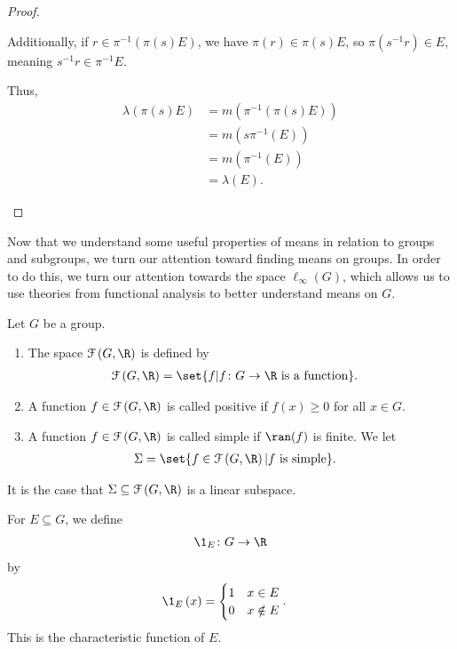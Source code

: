 \begin{proof}
\begin{enumerate}[(1)]
      Additionally, if $r\in \pi^{-1}\left(\pi(s)E\right)$, we have $\pi(r)\in \pi(s)E$, so $\pi\left(s^{-1}r\right)\in E$, meaning $s^{-1}r\in \pi^{-1}E$.\newline

      Thus,
      \begin{align*}
        \lambda\left(\pi\left(s\right)E\right) &= m\left(\pi^{-1}\left(\pi\left(s\right)E\right)\right)\\
                                               &= m\left(s\pi^{-1}\left(E\right)\right)\\
                                               &= m\left(\pi^{-1}\left(E\right)\right)\\
                                               &= \lambda\left(E\right).
      \end{align*}
  \end{enumerate}
\end{proof}
Now that we understand some useful properties of means in relation to groups and subgroups, we turn our attention toward finding means on groups. In order to do this, we turn our attention towards the space $\ell_{\infty}\left(G\right)$, which allows us to use theories from functional analysis to better understand means on $G$.
\begin{definition}
  Let $G$ be a group.
  \begin{enumerate}[(1)]
    \item The space $\mathcal{F}\left(G,\R\right)$ is defined by
      \begin{align*}
        \mathcal{F}\left(G,\R\right) &= \set{f | f\colon G\rightarrow \R\text{ is a function}}.
      \end{align*}
    \item A function $f\in \mathcal{F}\left(G,\R\right)$ is called positive if $f(x) \geq 0$ for all $x\in G$.
    \item A function $f\in \mathcal{F}\left(G,\R\right)$ is called simple if $\ran(f)$ is finite. We let
      \begin{align*}
        \Sigma &= \set{f\in \mathcal{F}\left(G,\R\right) | f\text{ is simple}}.
      \end{align*}
  \end{enumerate}
\end{definition}
\begin{fact}
  It is the case that $\Sigma \subseteq \mathcal{F}\left(G,\R\right)$ is a linear subspace.
\end{fact}
\begin{definition}
  For $E\subseteq G$, we define
  \begin{align*}
    \1_{E}\colon G\rightarrow \R
  \end{align*}
  by
  \begin{align*}
    \1_{E}\left(x\right) &= \begin{cases}
      1 & x\in E\\
      0 & x\notin E
    \end{cases}.
  \end{align*}
  This is the characteristic function of $E$.
\end{definition}
